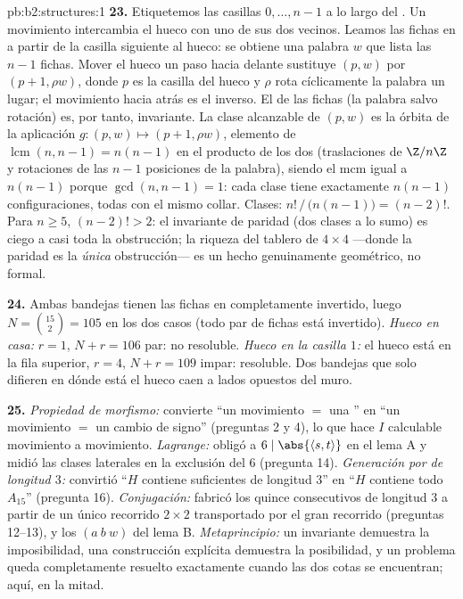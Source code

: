 \begin{solution}{pb:b2:structures:1}
\textbf{23.} Etiquetemos las casillas $0, \dots, n-1$ a lo largo
del . Un movimiento intercambia el hueco con uno de sus dos
vecinos. Leamos las fichas en   a partir de la casilla
siguiente al hueco: se obtiene una palabra $w$ que lista las $n -
1$ fichas. Mover el hueco un paso hacia delante sustituye $(p, w)$
por $(p + 1, \rho w)$, donde $p$ es la casilla del hueco y $\rho$
rota cíclicamente la palabra un lugar; el movimiento hacia atrás es
el inverso. El  \emph{} de las fichas (la palabra salvo
rotación) es, por tanto, invariante. La clase alcanzable de $(p,
w)$ es la órbita de la aplicación $g \colon (p, w) \mapsto (p+1,
\rho w)$, elemento de  $\operatorname{lcm}(n, n-1) = n(n-1)$
en el producto de los dos  (traslaciones de $\Z/n\Z$
y rotaciones de las $n-1$ posiciones de la palabra), siendo el mcm
igual a $n(n-1)$ porque $\gcd(n, n-1) = 1$: cada clase tiene
exactamente $n(n-1)$ configuraciones, todas con el mismo collar.
Clases: $n!\,/\,\bigl(n(n-1)\bigr) = (n-2)!$. Para $n \geq 5$,
$(n-2)! > 2$: el invariante de paridad (dos clases a lo sumo) es
ciego a casi toda la obstrucción; la riqueza del tablero de $4
\times 4$ ---donde la paridad es la \emph{única} obstrucción--- es
un hecho genuinamente geométrico, no formal.

\textbf{24.} Ambas bandejas tienen las fichas en 
completamente invertido, luego $N = \binom{15}{2} = 105$ en los dos
casos (todo par de fichas está invertido). \emph{Hueco en casa:} $r
= 1$, $N + r = 106$ par: no resoluble. \emph{Hueco en la casilla
$1$:} el hueco está en la fila superior, $r = 4$, $N + r = 109$
impar: resoluble. Dos bandejas que solo difieren en dónde está el
hueco caen a lados opuestos del muro.

\textbf{25.} \emph{Propiedad de morfismo:} convierte ``un
movimiento $=$ una '' en ``un movimiento $=$ un cambio
de signo'' (preguntas 2 y 4), lo que hace $I$ calculable movimiento
a movimiento. \emph{Lagrange:} obligó a $6 \mid \abs{\langle s,
t\rangle}$ en el lema A y midió las clases laterales en la
exclusión del  $6$ (pregunta 14). \emph{Generación por 
de longitud $3$:} convirtió ``$H$ contiene suficientes  de
longitud $3$'' en ``$H$ contiene todo $A_{15}$'' (pregunta 16).
\emph{Conjugación:} fabricó los quince  consecutivos de
longitud $3$ a partir de un único recorrido $2 \times 2$
transportado por el gran recorrido (preguntas 12--13), y los 
$(a\ b\ w)$ del lema B. \emph{Metaprincipio:} un invariante
demuestra la imposibilidad, una construcción explícita demuestra la
posibilidad, y un problema queda completamente resuelto exactamente
cuando las dos cotas se encuentran; aquí, en la mitad.
\end{solution}
